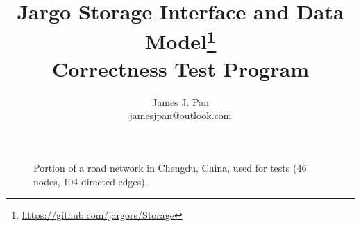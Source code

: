 \documentclass{article}
\title{Jargo Storage Interface
  and Data Model\footnote{\url{https://github.com/jargors/Storage}}\\
  \vspace{.5em}
  \Large{\textbf{Correctness Test Program}}}
\author{James J. Pan\\
  \small{\href{mailto:jamesjpan@outlook.com}{jamesjpan@outlook.com}}
}
\theoremstyle{definition}
\begin{document}
\maketitle
\pagestyle{noweb}

\begin{figure}[h]
\centering
{}
\caption{Portion of a road network in Chengdu, China,
    used for tests (46 nodes, 104 directed edges).}
\label{fig:road-network}
\end{figure}
\newpage

\tableofcontents
\end{document}
